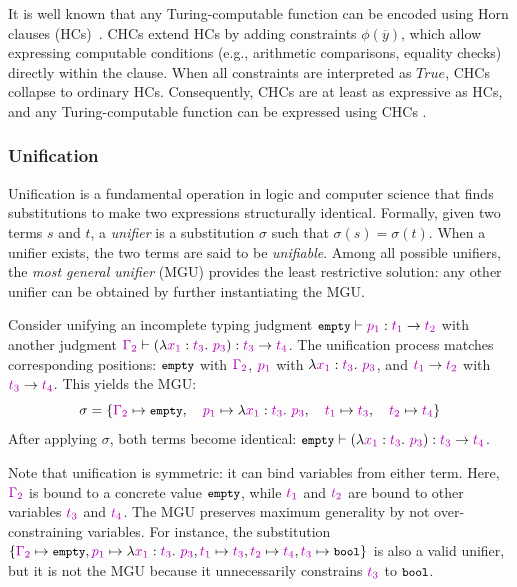 \documentclass[manuscript,screen]{acmart}
\newcommand{\stlctype}[3]{{#1} \vdash {#2} : {#3}}
\newcommand{\sk}[1]{\textcolor{skunknown}{#1}}
\newcommand{\tcode}[1]{{\small \texttt{\spaceskip=0.2em #1}}}
\begin{document}
It is well known that any Turing-computable function can be encoded using Horn clauses (HCs)~\cite{DBLP:journals/bit/Tarnlund77}. CHCs extend HCs by adding constraints $\phi(\overline{y})$, which allow expressing computable conditions (e.g., arithmetic comparisons, equality checks) directly within the clause. When all constraints are interpreted as $\mathit{True}$, CHCs collapse to ordinary HCs. Consequently, CHCs are at least as expressive as HCs, and any Turing-computable function can be expressed using CHCs  .

\subsubsection{Unification}
Unification is a fundamental operation in logic and computer science that finds substitutions to make two expressions structurally identical. Formally, given two terms $s$ and $t$, a \emph{unifier} is a substitution $\sigma$ such that $\sigma(s) = \sigma(t)$. When a unifier exists, the two terms are said to be \emph{unifiable}. Among all possible unifiers, the \emph{most general unifier} (MGU) provides the least restrictive solution: any other unifier can be obtained by further instantiating the MGU.

\begin{example}
Consider unifying an incomplete typing judgment $\stlctype{\tcode{empty}}{\sk{p_1}}{\arr{\sk{t_1}}{\sk{t_2}}}$ with another judgment $\stlctype{\sk{\Gamma_2}}{\left(\abs{\sk{x_1}}{\sk{t_3}}{\sk{p_3}}\right)}{\arr{\sk{t_3}}{\sk{t_4}}}$. The unification process matches corresponding positions: $\tcode{empty}$ with $\sk{\Gamma_2}$, $\sk{p_1}$ with $\abs{\sk{x_1}}{\sk{t_3}}{\sk{p_3}}$, and $\arr{\sk{t_1}}{\sk{t_2}}$ with $\arr{\sk{t_3}}{\sk{t_4}}$. This yields the MGU:
\[
\sigma = \{\sk{\Gamma_2} \mapsto \tcode{empty},\quad\sk{p_1} \mapsto \abs{\sk{x_1}}{\sk{t_3}}{\sk{p_3}},\quad\sk{t_1} \mapsto \sk{t_3},\quad\sk{t_2} \mapsto \sk{t_4}\}
\]
After applying $\sigma$, both terms become identical: $\stlctype{\tcode{empty}}{\left(\abs{\sk{x_1}}{\sk{t_3}}{\sk{p_3}}\right)}{\arr{\sk{t_3}}{\sk{t_4}}}$.

Note that unification is symmetric: it can bind variables from either term. Here, $\sk{\Gamma_2}$ is bound to a concrete value $\tcode{empty}$, while $\sk{t_1}$ and $\sk{t_2}$ are bound to other variables $\sk{t_3}$ and $\sk{t_4}$.
The MGU preserves maximum generality by not over-constraining variables. For instance, the substitution $\{\sk{\Gamma_2} \mapsto \tcode{empty}, \sk{p_1} \mapsto \abs{\sk{x_1}}{\sk{t_3}}{\sk{p_3}}, \sk{t_1} \mapsto \sk{t_3}, \sk{t_2} \mapsto \sk{t_4}, \sk{t_3} \mapsto \tcode{bool}\}$ is also a valid unifier, but it is not the MGU because it unnecessarily constrains $\sk{t_3}$ to $\tcode{bool}$.
\end{example}
\end{document}

